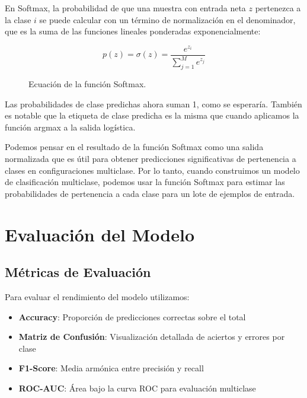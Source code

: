 En Softmax, la probabilidad de que una muestra con entrada neta $z$ pertenezca a la clase $i$ se puede calcular con un término de normalización en el denominador, que es la suma de las funciones lineales ponderadas exponencialmente:

\begin{figure}[h!]
    \centering
    \begin{equation}
        p(z) = \sigma(z) = \frac{e^{z_i}}{\sum_{j=1}^M e^{z_j}}
    \end{equation}
    \caption{Ecuación de la función Softmax.}
    \label{fig:softmax_equation}
\end{figure}

Las probabilidades de clase predichas ahora suman 1, como se esperaría. También es notable que la etiqueta de clase predicha es la misma que cuando aplicamos la función argmax a la salida logística.

Podemos pensar en el resultado de la función Softmax como una salida normalizada que es útil para obtener predicciones significativas de pertenencia a clases en configuraciones multiclase. Por lo tanto, cuando construimos un modelo de clasificación multiclase, podemos usar la función Softmax para estimar las probabilidades de pertenencia a cada clase para un lote de ejemplos de entrada.

\section{Evaluación del Modelo}

\subsection{Métricas de Evaluación}
Para evaluar el rendimiento del modelo utilizamos:
\begin{itemize}
    \item \textbf{Accuracy}: Proporción de predicciones correctas sobre el total
    \item \textbf{Matriz de Confusión}: Visualización detallada de aciertos y errores por clase
    \item \textbf{F1-Score}: Media armónica entre precisión y recall
    \item \textbf{ROC-AUC}: Área bajo la curva ROC para evaluación multiclase
\end{itemize}
